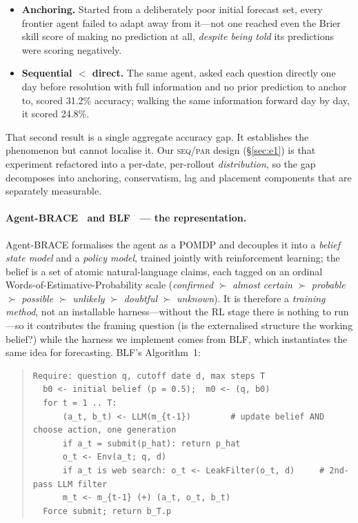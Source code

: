 \documentclass[10pt]{article}
\newcommand{\seq}{\textsc{seq}}
\newcommand{\pl}{\textsc{par}}
\begin{document}
\begin{itemize}
\item \textbf{Anchoring.} Started from a deliberately poor initial forecast set, every frontier
agent failed to adapt away from it---not one reached even the Brier skill score of making no
prediction at all, \emph{despite being told} its predictions were scoring negatively.
\item \textbf{Sequential $<$ direct.} The same agent, asked each question directly one day before
resolution with full information and no prior prediction to anchor to, scored 31.2\% accuracy;
walking the same information forward day by day, it scored 24.8\%.
\end{itemize}

That second result is a single aggregate accuracy gap. It establishes the phenomenon but cannot
localise it. Our \seq/\pl{} design (\S\ref{sec:e1}) is that experiment refactored into a per-date,
per-rollout \emph{distribution}, so the gap decomposes into anchoring, conservatism, lag and
placement components that are separately measurable.

\paragraph{Agent-BRACE~\cite{agentbrace} and BLF~\cite{blf} --- the representation.}
Agent-BRACE formalises the agent as a POMDP and decouples it into a \emph{belief state model} and
a \emph{policy model}, trained jointly with reinforcement learning; the belief is a set of atomic
natural-language claims, each tagged on an ordinal Words-of-Estimative-Probability scale
(\emph{confirmed} $\succ$ \emph{almost certain} $\succ$ \emph{probable} $\succ$ \emph{possible}
$\succ$ \emph{unlikely} $\succ$ \emph{doubtful} $\succ$ \emph{unknown}). It is therefore a
\emph{training method}, not an installable harness---without the RL stage there is nothing to
run---so it contributes the framing question (is the externalised structure the working belief?)
while the harness we implement comes from BLF, which instantiates the same idea for forecasting.
BLF's Algorithm~1:

\begin{quote}\small\begin{verbatim}
Require: question q, cutoff date d, max steps T
  b0 <- initial belief (p = 0.5);  m0 <- (q, b0)
  for t = 1 .. T:
      (a_t, b_t) <- LLM(m_{t-1})        # update belief AND choose action, one generation
      if a_t = submit(p_hat): return p_hat
      o_t <- Env(a_t; q, d)
      if a_t is web search: o_t <- LeakFilter(o_t, d)     # 2nd-pass LLM filter
      m_t <- m_{t-1} (+) (a_t, o_t, b_t)
  Force submit; return b_T.p
\end{verbatim}\end{quote}
\end{document}
